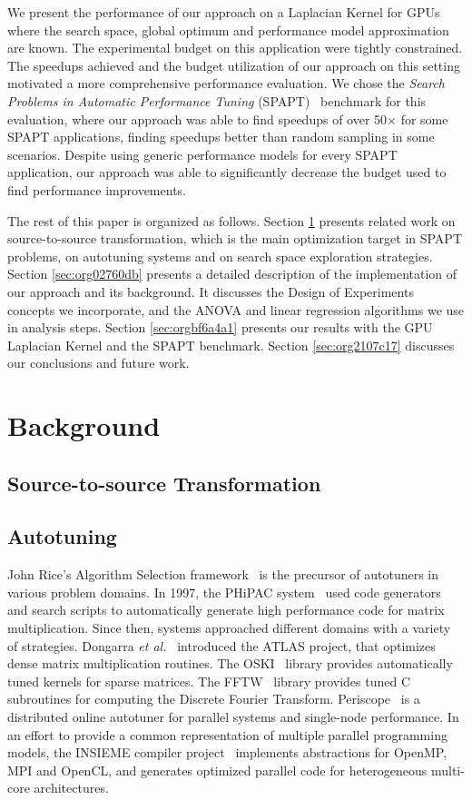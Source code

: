 \documentclass[conference]{IEEEtran}
\begin{document}
We present the performance of our approach on a Laplacian Kernel for GPUs where
the search space, global optimum and performance model approximation are known.
The experimental budget on this application were tightly constrained. The
speedups achieved and the budget utilization of our approach on this setting
motivated a more comprehensive performance evaluation. We chose the \emph{Search
Problems in Automatic Performance Tuning}
(SPAPT)~\cite{balaprakash2012spapt} benchmark for this evaluation, where
our approach was able to find speedups of over 50\(\times\) for some SPAPT
applications, finding speedups better than random sampling in some scenarios.
Despite using generic performance models for every SPAPT application, our
approach was able to significantly decrease the budget used to find performance
improvements.

The rest of this paper is organized as follows. Section \ref{sec:org3995892} presents
related work on source-to-source transformation, which is the main optimization
target in SPAPT problems, on autotuning systems and on search space exploration
strategies. Section \ref{sec:org02760db} presents a
detailed description of the implementation of our approach and its background.
It discusses the Design of Experiments concepts we incorporate, and the ANOVA
and linear regression algorithms we use in analysis steps. Section \ref{sec:orgbf6a4a1} presents our results with the GPU Laplacian Kernel and the SPAPT
benchmark. Section \ref{sec:org2107c17} discusses our conclusions and future work.
\section{Background}
\label{sec:org3995892}
\subsection{Source-to-source Transformation}
\label{sec:org6446bf6}
\subsection{Autotuning}
\label{sec:orgd149ee4}
John Rice's Algorithm Selection framework~\cite{rice1976algorithm} is the
precursor of autotuners in various problem domains. In 1997, the PHiPAC
system~\cite{bilmes1997optimizing} used code generators and search scripts
to automatically generate high performance code for matrix multiplication. Since
then, systems approached different domains with a variety of strategies.
Dongarra \emph{et al.}~\cite{dongarra1998automatically} introduced the ATLAS
project, that optimizes dense matrix multiplication routines. The
OSKI~\cite{vuduc2005oski} library provides automatically tuned kernels for
sparse matrices. The FFTW~\cite{frigo1998fftw} library provides tuned C
subroutines for computing the Discrete Fourier Transform.
Periscope~\cite{gerndt2010automatic} is a distributed online autotuner for
parallel systems and single-node performance. In an effort to provide a common
representation of multiple parallel programming models, the INSIEME compiler
project~\cite{jordan2012multi} implements abstractions for OpenMP, MPI and
OpenCL, and generates optimized parallel code for heterogeneous multi-core
architectures.
\end{document}
